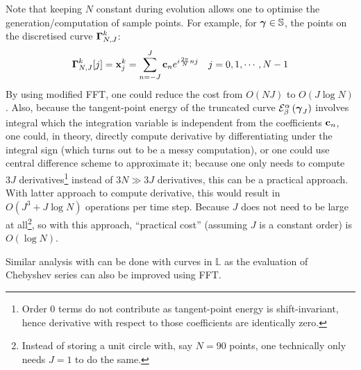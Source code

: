 \documentclass[../dissertation.tex]{subfiles}
\begin{document}
Note that keeping $N$ constant during evolution allows one to optimise the generation/computation of sample points.
For example, for $\boldsymbol{\gamma} \in \mathbb{S}$, the points on the discretised curve $\boldsymbol{\Gamma}_{N,J}^k$:
\begin{align}
    \boldsymbol{\Gamma}_{N,J}^k [j] &= \mathbf{x}_{j}^{k} = \sum_{n=-J}^{J} \mathbf{c}_{n} e^{i \frac{2\pi}{N}n j} & j=0,1,\cdots,N-1
\end{align}
By using modified FFT\cite{5213896}, one could reduce the cost from $O\left( NJ \right)$ to $O \left( J \log N \right)$.
Also, because the tangent-point energy of the truncated curve $\mathcal{E}_{\beta}^{\alpha} \left( \boldsymbol{\gamma}_{J} \right)$ involves integral which the integration variable is independent from the coefficients $\mathbf{c}_n$,
one could, in theory, directly compute derivative by differentiating under the integral sign (which turns out to be a messy computation),
or one could use central difference scheme to approximate it;
because one only needs to compute $3J$ derivatives\footnote{Order $0$ terms do not contribute as tangent-point energy is shift-invariant, hence derivative with respect to those coefficients are identically zero.}
instead of $3N \gg 3J$ derivatives, this can be a practical approach.
With latter approach to compute derivative, this would result in $O\left( J^3 + J \log N \right)$ operations per time step.
Because $J$ does not need to be large at all\footnote{Instead of storing a unit circle with, say $N = 90$ points, one technically only needs $J=1$ to do the same.},
so with this approach, ``practical cost'' (assuming $J$ is a constant order) is $O\left( \log N \right)$.

Similar analysis with can be done with curves in $\mathbb{L}$ as the evaluation of Chebyshev series can also be improved using FFT\cite{Trefethen_2020}.
\end{document}

